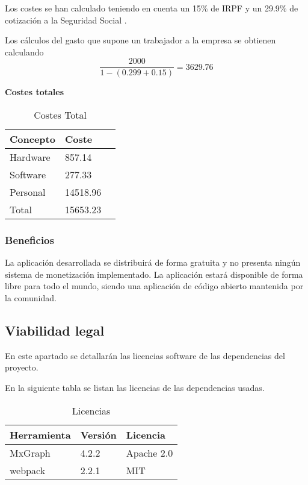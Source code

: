 Los costes se han calculado teniendo en cuenta un 15\% de IRPF \cite{ia:irpf} y un 29.9\% de cotización a la Seguridad Social \cite{ss:cotiz}.

Los cálculos del gasto que supone un trabajador a la empresa se obtienen calculando $$\frac{2000}{1-(0.299+0.15)}=3629.76$$

\textbf{Costes totales}
\begin{table}[H]
    \centering
    \begin{tabular}{@{}lll@{}}\toprule
         \textbf{Concepto} & \textbf{Coste} \\ \midrule
         Hardware & 857.14 \\
         Software & 277.33\\
         Personal & 14518.96\\ \midrule
         Total & 15653.23\\ \bottomrule
    \end{tabular}
    \caption{Costes Total}
    \label{ve:cost-tot}
\end{table}

\subsubsection{Beneficios}

La aplicación desarrollada se distribuirá de forma gratuita y no presenta ningún sistema de monetización implementado. La aplicación estará disponible de forma libre para todo el mundo, siendo una aplicación de código abierto mantenida por la comunidad.

\subsection{Viabilidad legal}
En este apartado se detallarán las licencias software de las dependencias del proyecto.

En la siguiente tabla se listan las licencias de las dependencias usadas.
\begin{table}[H]
    \centering
    \begin{tabular}{@{}lll@{}}\toprule
        \textbf{Herramienta} & \textbf{Versión} & \textbf{Licencia}\\ \midrule
        MxGraph & 4.2.2 & Apache 2.0 \\
        webpack & 2.2.1 & MIT \\ \bottomrule
    \end{tabular}
    \caption{Licencias}
    \label{tab:my_label}
\end{table}

